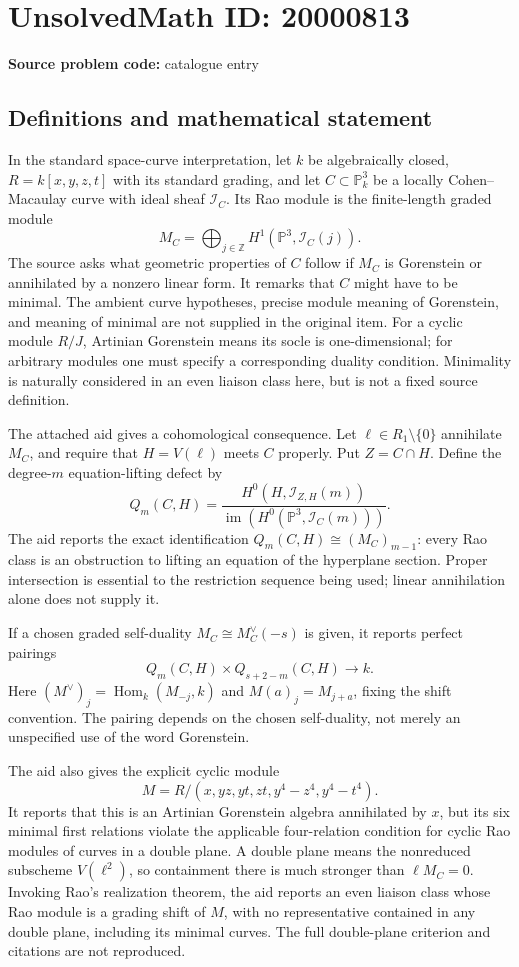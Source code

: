 \documentclass[11pt]{article}
\newcommand{\Z}{\mathbb{Z}}
\newcommand{\PP}{\mathbb{P}}
\begin{document}
\section*{UnsolvedMath ID: 20000813}
\textbf{Source problem code:} catalogue entry
\subsection{Definitions and mathematical statement}
In the standard space-curve interpretation, let \(k\) be algebraically closed, \(R=k[x,y,z,t]\) with its standard grading, and let \(C\subset\PP^3_k\) be a locally Cohen--Macaulay curve with ideal sheaf \(\mathcal I_C\). Its Rao module is the finite-length graded module
\[
M_C=\bigoplus_{j\in\Z}H^1(\PP^3,\mathcal I_C(j)).
\]
The source asks what geometric properties of \(C\) follow if \(M_C\) is Gorenstein or annihilated by a nonzero linear form. It remarks that \(C\) might have to be minimal. The ambient curve hypotheses, precise module meaning of Gorenstein, and meaning of minimal are not supplied in the original item. For a cyclic module \(R/J\), Artinian Gorenstein means its socle is one-dimensional; for arbitrary modules one must specify a corresponding duality condition. Minimality is naturally considered in an even liaison class here, but is not a fixed source definition.

The attached aid gives a cohomological consequence. Let \(\ell\in R_1\setminus\{0\}\) annihilate \(M_C\), and require that \(H=V(\ell)\) meets \(C\) properly. Put \(Z=C\cap H\). Define the degree-\(m\) equation-lifting defect by
\[
Q_m(C,H)=
\frac{H^0(H,\mathcal I_{Z,H}(m))}
{\operatorname{im}(H^0(\PP^3,\mathcal I_C(m)))}.
\]
The aid reports the exact identification \(Q_m(C,H)\cong(M_C)_{m-1}\): every Rao class is an obstruction to lifting an equation of the hyperplane section. Proper intersection is essential to the restriction sequence being used; linear annihilation alone does not supply it.

If a chosen graded self-duality \(M_C\cong M_C^\vee(-s)\) is given, it reports perfect pairings
\[
Q_m(C,H)\times Q_{s+2-m}(C,H)\longrightarrow k.
\]
Here \((M^\vee)_j=\operatorname{Hom}_k(M_{-j},k)\) and \(M(a)_j=M_{j+a}\), fixing the shift convention. The pairing depends on the chosen self-duality, not merely an unspecified use of the word Gorenstein.

The aid also gives the explicit cyclic module
\[
M=R/(x,yz,yt,zt,y^4-z^4,y^4-t^4).
\]
It reports that this is an Artinian Gorenstein algebra annihilated by \(x\), but its six minimal first relations violate the applicable four-relation condition for cyclic Rao modules of curves in a double plane. A double plane means the nonreduced subscheme \(V(\ell^2)\), so containment there is much stronger than \(\ell M_C=0\). Invoking Rao's realization theorem, the aid reports an even liaison class whose Rao module is a grading shift of \(M\), with no representative contained in any double plane, including its minimal curves. The full double-plane criterion and citations are not reproduced.
\end{document}

